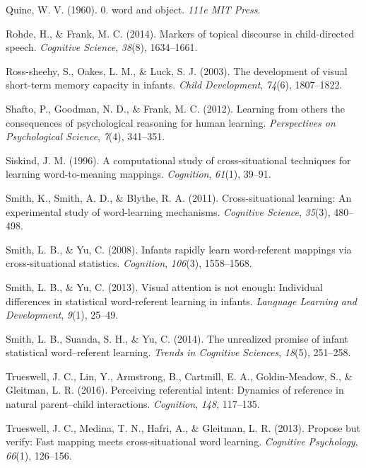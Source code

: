 \documentclass[authoryear, review]{elsarticle}
\begin{document}
\hypertarget{ref-quine19600}{}
Quine, W. V. (1960). 0. word and object. \emph{111e MIT Press}.

\hypertarget{ref-rohde2014markers}{}
Rohde, H., \& Frank, M. C. (2014). Markers of topical discourse in
child-directed speech. \emph{Cognitive Science}, \emph{38}(8),
1634--1661.

\hypertarget{ref-ross2003development}{}
Ross-sheehy, S., Oakes, L. M., \& Luck, S. J. (2003). The development of
visual short-term memory capacity in infants. \emph{Child Development},
\emph{74}(6), 1807--1822.

\hypertarget{ref-shafto2012learning}{}
Shafto, P., Goodman, N. D., \& Frank, M. C. (2012). Learning from others
the consequences of psychological reasoning for human learning.
\emph{Perspectives on Psychological Science}, \emph{7}(4), 341--351.

\hypertarget{ref-siskind1996computational}{}
Siskind, J. M. (1996). A computational study of cross-situational
techniques for learning word-to-meaning mappings. \emph{Cognition},
\emph{61}(1), 39--91.

\hypertarget{ref-smith2011cross}{}
Smith, K., Smith, A. D., \& Blythe, R. A. (2011). Cross-situational
learning: An experimental study of word-learning mechanisms.
\emph{Cognitive Science}, \emph{35}(3), 480--498.

\hypertarget{ref-smith2008infants}{}
Smith, L. B., \& Yu, C. (2008). Infants rapidly learn word-referent
mappings via cross-situational statistics. \emph{Cognition},
\emph{106}(3), 1558--1568.

\hypertarget{ref-smith2013visual}{}
Smith, L. B., \& Yu, C. (2013). Visual attention is not enough:
Individual differences in statistical word-referent learning in infants.
\emph{Language Learning and Development}, \emph{9}(1), 25--49.

\hypertarget{ref-smith2014unrealized}{}
Smith, L. B., Suanda, S. H., \& Yu, C. (2014). The unrealized promise of
infant statistical word--referent learning. \emph{Trends in Cognitive
Sciences}, \emph{18}(5), 251--258.

\hypertarget{ref-trueswell2016perceiving}{}
Trueswell, J. C., Lin, Y., Armstrong, B., Cartmill, E. A.,
Goldin-Meadow, S., \& Gleitman, L. R. (2016). Perceiving referential
intent: Dynamics of reference in natural parent--child interactions.
\emph{Cognition}, \emph{148}, 117--135.

\hypertarget{ref-trueswell2013propose}{}
Trueswell, J. C., Medina, T. N., Hafri, A., \& Gleitman, L. R. (2013).
Propose but verify: Fast mapping meets cross-situational word learning.
\emph{Cognitive Psychology}, \emph{66}(1), 126--156.
\end{document}
